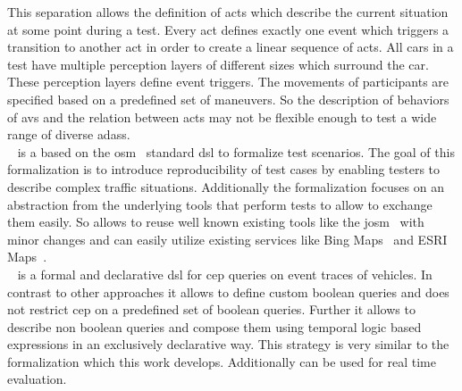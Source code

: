 This separation allows the definition of acts which describe the current situation at some point during a test.
Every act defines exactly one event which triggers a transition to another act in order to create a linear sequence of acts.
All cars in a test have multiple perception layers of different sizes which surround the car.
These perception layers define event triggers.
The movements of participants are specified based on a predefined set of maneuvers.
So the description of behaviors of \glspl{av} and the relation between acts may not be flexible enough to test a wide range of diverse \glspl{adas}.\\
\geoscenario{}~\cite{geoScenario} is a based on the \gls{osm}~\cite{openStreetMap} standard \gls{dsl} to formalize test scenarios.
The goal of this formalization is to introduce reproducibility of test cases by enabling testers to describe complex traffic situations.
Additionally the formalization focuses on an abstraction from the underlying tools that perform tests to allow to exchange them easily.
So \geoscenario{} allows to reuse well known existing tools like the \gls{josm}~\cite{josm} with minor changes and can easily utilize existing services like Bing Maps~\cite{bingMaps} and ESRI Maps~\cite{esriMaps}.\\
\beepbeep{}~\cite{beepbeep} is a formal and declarative \gls{dsl} for \gls{cep} queries on event traces of vehicles.
In contrast to other approaches it allows to define custom boolean queries and does not restrict \gls{cep} on a predefined set of boolean queries.
Further it allows to describe non boolean queries and compose them using temporal logic based expressions in an exclusively declarative way.
This strategy is very similar to the formalization which this work develops.
Additionally \beepbeep{} can be used for real time evaluation.

